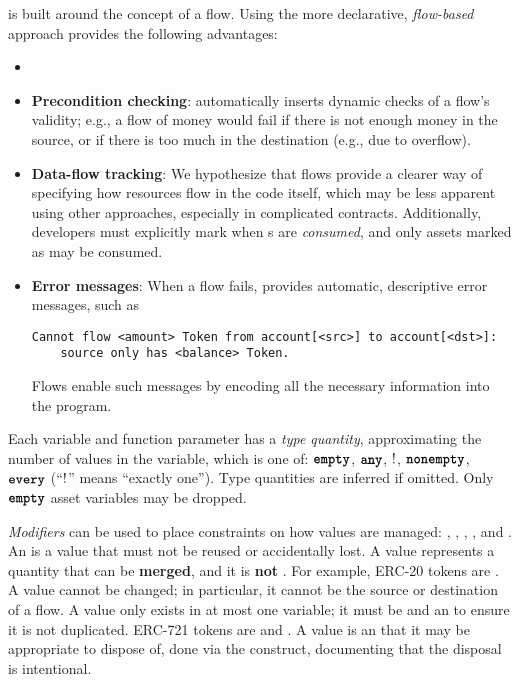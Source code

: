 \documentclass[dvipsnames,runningheads]{llncs}
\begin{document}
\langName is built around the concept of a flow.
Using the more declarative, \emph{flow-based} approach provides the following advantages:
\begin{itemize}
    \item {}
    \item \textbf{Precondition checking}: \langName automatically inserts dynamic checks of a flow's validity; e.g., a flow of money would fail if there is not enough money in the source, or if there is too much in the destination (e.g., due to overflow).
    \item \textbf{Data-flow tracking}: We hypothesize that flows provide a clearer way of specifying how resources flow in the code itself, which may be less apparent using other approaches, especially in complicated contracts.
        Additionally, developers must explicitly mark when \assetTxt{}s are \emph{consumed}, and only assets marked as  may be consumed.
    \item \textbf{Error messages}: When a flow fails, \langName provides automatic, descriptive error messages, such as
\begin{lstlisting}[numbers=none, basicstyle=\small\ttfamily, xleftmargin=-5.0ex]
Cannot flow <amount> Token from account[<src>] to account[<dst>]:
    source only has <balance> Token.
\end{lstlisting}
        Flows enable such messages by encoding all the necessary information into the program.
\end{itemize}

Each variable and function parameter has a \emph{type quantity}, approximating the number of values in the variable, which is one of: $\textbf{\texttt{empty}}$, $\textbf{\texttt{any}}$, $!$, $\textbf{\texttt{nonempty}}$, $\textbf{\texttt{every}}$ (``$!$'' means ``exactly one'').
Type quantities are inferred if omitted.
Only $\textbf{\texttt{empty}}$ asset variables may be dropped.

\emph{Modifiers} can be used to place constraints on how values are managed: , , , , and .
An  is a value that must not be reused or accidentally lost.
A  value represents a quantity that can be \textbf{merged}, and it is \textbf{not} .
For example, ERC-20 tokens are .
A  value cannot be changed; in particular, it cannot be the source or destination of a flow.
A  value only exists in at most one variable; it must be  and an  to ensure it is not duplicated.
ERC-721 tokens are  and .
A  value is an  that it may be appropriate to dispose of, done via the  construct, documenting that the disposal is intentional.
\end{document}
